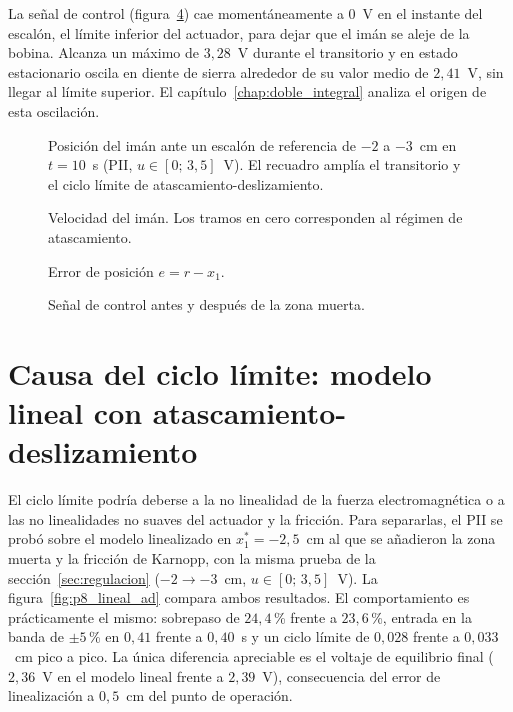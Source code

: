 La señal de control (figura~\ref{senal_control}) cae momentáneamente a 0~V en el instante del escalón, el límite inferior del actuador, para dejar que el imán se aleje de la bobina. Alcanza un máximo de $3{,}28$~V durante el transitorio y en estado estacionario oscila en diente de sierra alrededor de su valor medio de $2{,}41$~V, sin llegar al límite superior. El capítulo~\ref{chap:doble_integral} analiza el origen de esta oscilación.

\begin{figure}[ht]
    \centering
    
    \caption[Posición (regulación)]{Posición del imán ante un escalón de referencia de $-2$ a $-3$~cm en $t=10$~s (PII, $u\in[0;\,3{,}5]$~V). El recuadro amplía el transitorio y el ciclo límite de atascamiento-deslizamiento.}
    \label{posicion}
\end{figure}

\begin{figure}[ht]
    \centering
    
    \caption[Velocidad (regulación)]{Velocidad del imán. Los tramos en cero corresponden al régimen de atascamiento.}
    \label{velocidad}
\end{figure}

\begin{figure}[ht]
    \centering
    
    \caption[Error (regulación)]{Error de posición $e=r-x_1$.}
    \label{error}
\end{figure}

\begin{figure}[ht]
    \centering
    
    \caption[Señal de control (regulación)]{Señal de control antes y después de la zona muerta.}
    \label{senal_control}
\end{figure}

\FloatBarrier

\section{Causa del ciclo límite: modelo lineal con atascamiento-deslizamiento}
\label{sec:lineal_ad}

El ciclo límite podría deberse a la no linealidad de la fuerza electromagnética o a las no linealidades no suaves del actuador y la fricción. Para separarlas, el PII se probó sobre el modelo linealizado en $x_1^*=-2{,}5$~cm al que se añadieron la zona muerta y la fricción de Karnopp, con la misma prueba de la sección~\ref{sec:regulacion} ($-2\to-3$~cm, $u\in[0;\,3{,}5]$~V). La figura~\ref{fig:p8_lineal_ad} compara ambos resultados. El comportamiento es prácticamente el mismo: sobrepaso de $24{,}4$\,\% frente a $23{,}6$\,\%, entrada en la banda de $\pm5$\,\% en $0{,}41$ frente a $0{,}40$~s y un ciclo límite de $0{,}028$ frente a $0{,}033$~cm pico a pico. La única diferencia apreciable es el voltaje de equilibrio final ($2{,}36$~V en el modelo lineal frente a $2{,}39$~V), consecuencia del error de linealización a $0{,}5$~cm del punto de operación.

